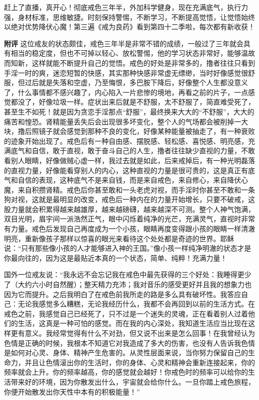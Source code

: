 \begin{case}
    赶上了直播，真开心！彻底戒色三年半，外加科学健身，现在充满底气，执行力强，身材标准，思维敏捷。时刻保持警惕，不断学习，不断提高觉悟，让觉悟始终以绝对优势降伏心魔！第三遍《戒为良药》看到第四十二季啦，每次都有新收获！

    \textbf{附评} 这位戒友的状态颇佳，戒色三年半是非常不错的成绩，一般过了三年就会具有相当的稳定度，但也不可掉以轻心、放松警惕，他的学习状态非常好，能够温故而知新，这样就能不断提升自己的觉悟。戒色的好处是非常多的，撸者往往只看到手淫一时的爽，迷恋短暂的快感，其实那种快感非常虚无缥缈，当时好像感觉很舒服，但过后就是失落和空虚，乃至悔恨，多巴胺下降后，好像整个人生都没意义了，什么事情都不感兴趣了，内心陷入一片悲惨的境地，再看之前的片子，一点感觉都没了，好像垃圾一样。症状出来后就是不舒服，太不舒服了，简直难受死了，甚至生不如死！就是因为贪恋手淫那点“舒服”，最终换来大大的“不舒服”，大大的痛苦和惶恐。肾精能量丢失后会出现很多坏变化，整个人的气场都会被削掉一大块，撸后照镜子就会感觉到那种不良的变化，好像某种能量被抽走了，有一种衰败的迹象开始出现了。戒色后有一种自由感、摆脱感、轻松感、喜悦感、明亮感，充满底气和自信，敢于直视，敢于奋斗自己的人生，撸者往往缺少直视的力量，不敢看别人眼睛，好像做贼心虚一样，我过去就是如此，后来戒掉后，有一种光明磊落的直视力量，好像能看穿别人的内心，这种直视的力量是很可贵的，这是真正有底气和自信的表现，这种底气不是来自钱，而是来自戒色，来自修心，来自降伏心魔，来自积攒肾精。戒色后你甚至敢和一头老虎对视，而手淫时你甚至不敢和一条狗对视，这就是最明显的改变，戒色后一种内在的力量开始增长，只要不破戒，这股力量就会积累得越来越雄厚，越来越磅礴，越来越深不可测。整个人神气饱满，双目光明，眉宇间一派浩然正气，眼中闪烁着纯净的光芒，充满灵气，直视时非常有力量。戒色后发现自己再度成为一个小孩，眼睛再度变得跟小孩的眼睛一样清澈明亮，重新像孩子那样以惊喜的眼光来看待这个处处都是奇迹的世界。耶稣说：“只有那些像小孩的人才能够进入神的王国。”像小孩一样纯净明澈的状态才是你最向往的，因为这是最贴近本真的一个状态，简单、纯粹！充满力量！

    国外一位戒友说：“我永远不会忘记我在戒色中最先获得的三个好处：我睡得更少了（大约六小时自然醒）；整天精力充沛；我对音乐的感受更好并且我的想象力也因为它而提升。之后我明白了在戒色前我所走的路是多么具有破坏性。我答应自己：无论我感觉多么糟糕，无论我经历什么，我都不会再回到以前的生活方式。在戒色之前，我感觉自己已经死了，只不过是一个迷失的灵魂，正在看着别人过着他们的生活，这真是一种可怕的感觉。而在我的内心深处，我知道生活应当比现在这样更有意义。我经常觉得有什么不对劲，但又说不出来是怎么回事！在我曾经认为色情是正确的时候，我根本不知道它对我造成了多大的伤害，也没有人告诉我色情是如何对心灵、身体、精神产生危害的。从灵性层面来说，当你努力保留自己的生命力，并且让色情滚出你的生活时，你的身体、心灵和精神会重新连接起来，你的频率就会上升。你的频率越高，你的感觉就会越好！你戒色时的频率可以给你的生活带来好的环境，因为你散发出什么，宇宙就会给你什么。一旦你踏上戒色旅程，你便开始散发出你天性中本有的积极能量！”


\end{case}
